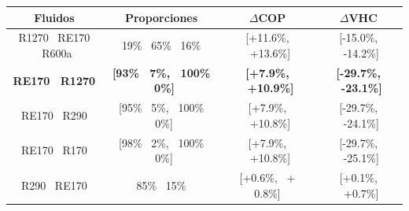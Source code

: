 \begin{tabular}{|c|c|c|c|}
\hline
\textbf{Fluidos} & \textbf{Proporciones} & \textbf{$\Delta$COP} & \textbf{$\Delta$VHC} \\ \hline
R1270 \ RE170 \ R600a & 19\% \ 65\% \ 16\% & [+11.6\%, \ +13.6\%] & [-15.0\%, \ -14.2\%] \\ \hline
\textbf{RE170 \ R1270} & \textbf{[93\% \ 7\%, \ 100\% \ 0\%]} & \textbf{[+7.9\%, \ +10.9\%]} & \textbf{[-29.7\%, \ -23.1\%]} \\ \hline
RE170 \ R290 & [95\% \ 5\%, \ 100\% \ 0\%] & [+7.9\%, \ +10.8\%] & [-29.7\%, \ -24.1\%] \\ \hline
RE170 \ R170 & [98\% \ 2\%, \ 100\% \ 0\%] & [+7.9\%, \ +10.8\%] & [-29.7\%, \ -25.1\%] \\ \hline
R290 \ RE170 & 85\% \ 15\% & [+0.6\%, \ + 0.8\%] & [+0.1\%, \ +0.7\%] \\ \hline
\end{tabular}